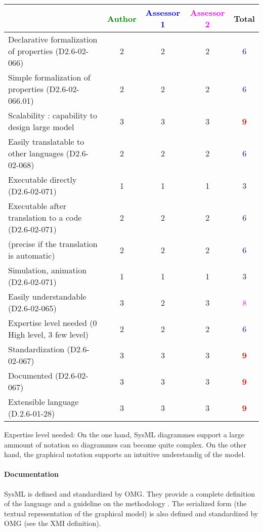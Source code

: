 \begin{tabular}{|l | c | c | c | c|}
\hline
& \textcolor{green}{Author} & \textcolor{blue}{Assessor 1} & \textcolor{magenta}{Assessor 2} & Total \\
\hline
Declarative formalization of properties (D2.6-02-066) & 2     & 2     & 2     & \textcolor{blue}{6} \\
\hline
Simple formalization of properties (D2.6-02-066.01) &2 &2 & 2    & \textcolor{blue}{6} \\
\hline
Scalability : capability to design large model &3 &3 &3 & \textcolor{red}{\textbf{9}} \\
\hline
Easily translatable to other languages (D2.6-02-068) &2 &2 & 2    & \textcolor{blue}{6} \\
\hline
Executable directly (D2.6-02-071) &1 & 1    & 1    & 3     \\
\hline
Executable after translation to a code (D2.6-02-071) & 2     & 2    & 2    & \textcolor{blue}{6} \\
(precise if the translation is automatic) &2 & 2    & 2    & \textcolor{blue}{6} \\
\hline
Simulation, animation (D2.6-02-071) &1 & 1    & 1    & 3     \\
\hline
Easily understandable (D2.6-02-065) &3 & 2    & 3    & \textcolor{magenta}{8} \\
\hline
Expertise level needed (0 High level, 3 few level) &2 &2 & 2    & \textcolor{blue}{6} \\
\hline
Standardization (D2.6-02-067) &3 & 3    & 3    & \textcolor{red}{\textbf{9}} \\
\hline
Documented (D2.6-02-067) &3 & 3    & 3    & \textcolor{red}{\textbf{9}} \\
\hline
Extensible language (D.2.6-01-28) &3 & 3    & 3    & \textcolor{red}{\textbf{9}} \\
\hline
\end{tabular}
\begin{assessor2}
Expertise level needed: On the one hand, SysML diagrammes support a large ammount of notation so diagrammes can become quite complex. On the other hand, the graphical notation supports an intuitive understandig of the model.
\end{assessor2}

\paragraph{Documentation} 
SysML is  defined and standardized by OMG. They provide a complete
definition of the language and a guideline on the methodology
\cite{SysML}. The serialized form (the textual representation of the
graphical model) is also defined and standardized by OMG (see the XMI
definition).

